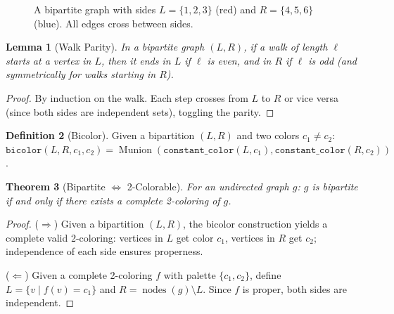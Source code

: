 \documentclass[11pt]{article}
\theoremstyle{plain}
\newtheorem{theorem}{Theorem}[section]
\newtheorem{lemma}[theorem]{Lemma}
\theoremstyle{definition}
\newtheorem{definition}[theorem]{Definition}
\theoremstyle{remark}
\newcommand{\nodes}{\operatorname{nodes}}
\newcommand{\Munion}{\operatorname{Munion}}
\begin{document}
\begin{figure}[ht]
\centering
{}
\caption{A bipartite graph with sides $L = \{1,2,3\}$ (red) and $R = \{4,5,6\}$ (blue). All edges cross between sides.}
\label{fig:bipartite}
\end{figure}

\begin{lemma}[Walk Parity]
\label{lem:walk-parity}
In a bipartite graph $(L, R)$, if a walk of length $\ell$ starts at a vertex in $L$, then it ends in $L$ if $\ell$ is even, and in $R$ if $\ell$ is odd (and symmetrically for walks starting in $R$).
\end{lemma}

\begin{proof}
By induction on the walk. Each step crosses from $L$ to $R$ or vice versa (since both sides are independent sets), toggling the parity.
\end{proof}

\begin{definition}[Bicolor]
Given a bipartition $(L, R)$ and two colors $c_1 \neq c_2$:
$\texttt{bicolor}(L, R, c_1, c_2) = \Munion(\texttt{constant\_color}(L, c_1), \texttt{constant\_color}(R, c_2))$.
\end{definition}

\begin{theorem}[Bipartite $\iff$ 2-Colorable]
\label{thm:bip-iff-2col}
For an undirected graph $g$: $g$ is bipartite if and only if there exists a complete 2-coloring of $g$.
\end{theorem}

\begin{proof}
($\Rightarrow$) Given a bipartition $(L, R)$, the bicolor construction yields a complete valid 2-coloring: vertices in $L$ get color $c_1$, vertices in $R$ get $c_2$; independence of each side ensures properness.

($\Leftarrow$) Given a complete 2-coloring $f$ with palette $\{c_1, c_2\}$, define $L = \{v \mid f(v) = c_1\}$ and $R = \nodes(g) \setminus L$. Since $f$ is proper, both sides are independent.
\end{proof}
\end{document}
